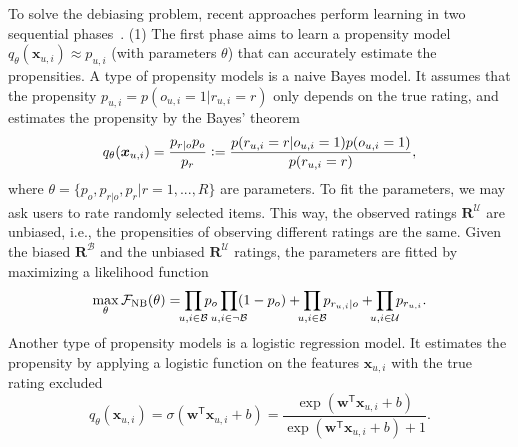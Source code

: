 \documentclass[letterpaper]{article} %
\newcommand{\transpose}{\mathsf{T}}
\newcommand{\matrixize}[1]{\mathbf{#1}}
\newcommand{\vectorize}[1]{\bm{#1}}
\newcommand{\lrdense}[2]{\smashoperator[lr]{#1_{#2}}}
\newcommand{\defeq}{\vcentcolon=}
\newcommand{\obsBiasedPairs}{\mathcal{B}}
\newcommand{\misBiasedPairs}{{\lnot\mathcal{B}}}
\newcommand{\obsUnbiasedPairs}{\mathcal{U}}
\newcommand{\propensity}{p_{u,i}}
\newcommand{\trueRatings}{\matrixize{R}}
\newcommand{\biasedRating}{r_{u,i}}
\newcommand{\ratingScale}{r}
\newcommand{\nScale}{R}
\newcommand{\obsIndicator}{o}
\newcommand{\observation}{\obsIndicator_{u,i}}
\newcommand{\featureMark}{x}
\newcommand{\biasedFeatures}{\vectorize{\featureMark}_{u,i}}
\newcommand{\likelihood}[1]{\mathcal{F}_{\rm #1}}
\newcommand{\nbProbability}{p}
\newcommand{\nbObservation}{\nbProbability}
\newcommand{\nbCondition}{\nbProbability}
\newcommand{\nbRating}{\nbProbability}
\newcommand{\lgBias}{b}
\newcommand{\lgWeight}{\vectorize{w}}
\newcommand{\propensityName}{q}
\newcommand{\propensityParam}{\theta}
\newcommand{\propensityModel}{\propensityName_\propensityParam(\biasedFeatures)}
\begin{document}
To solve the debiasing problem, recent approaches perform learning in two sequential phases~\cite{schnabel2016recommendations,wang2019doubly}.
(1) The first phase aims to learn a propensity model $\propensityModel\approx\propensity$ (with parameters $\propensityParam$) that can accurately estimate the propensities.
A type of propensity models is a naive Bayes model.
It assumes that the propensity $\propensity=p(\observation=1|\biasedRating=\ratingScale)$ only depends on the true rating, and estimates the propensity by the Bayes' theorem
\begin{equation*}
\propensityModel
=\frac{\nbCondition_{\ratingScale|\obsIndicator}\nbObservation_\obsIndicator}{\nbRating_\ratingScale}
\defeq
\frac{p(\biasedRating=\ratingScale|\observation=1)p(\observation=1)}{p(\biasedRating=\ratingScale)},
\end{equation*}%
where $\propensityParam=\{\nbObservation_\obsIndicator,\nbCondition_{\ratingScale|\obsIndicator},\nbRating_\ratingScale|\ratingScale=1,...,\nScale\}$ are parameters.
To fit the parameters, we may ask users to rate randomly selected items.
This way, the observed ratings $\trueRatings^\obsUnbiasedPairs$ are unbiased, i.e., the propensities of observing different ratings are the same.
Given the biased $\trueRatings^\obsBiasedPairs$ and the unbiased $\trueRatings^\obsUnbiasedPairs$ ratings, the parameters are fitted by maximizing a likelihood function
\begin{equation*}
\max_{\propensityParam}\likelihood{NB}(\propensityParam)
=\lrdense{\prod}{u,i\in\obsBiasedPairs}\nbObservation_\obsIndicator
\lrdense{\prod}{u,i\in\misBiasedPairs}(1-\nbObservation_\obsIndicator)
+\lrdense{\prod}{u,i\in\obsBiasedPairs}\nbCondition_{\biasedRating|\obsIndicator}
+\lrdense{\prod}{u,i\in\obsUnbiasedPairs}\nbRating_{\biasedRating}.
\end{equation*}%
Another type of propensity models is a logistic regression model.
It estimates the propensity by applying a logistic function on the features $\biasedFeatures$ with the true rating excluded
\begin{equation}
\label{eqn:logistic regression model}
\propensityModel
=\sigma(\lgWeight^\transpose\biasedFeatures+\lgBias)
=\frac{\exp(\lgWeight^\transpose\biasedFeatures+\lgBias)}
{\exp(\lgWeight^\transpose\biasedFeatures+\lgBias)+1}.
\end{equation}%
\end{document}
